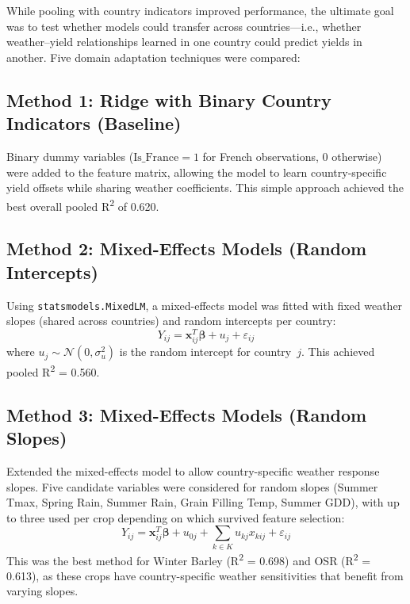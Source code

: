 \documentclass[12pt,a4paper]{report}
\newcommand{\rsq}{R\textsuperscript{2}}
\begin{document}
While pooling with country indicators improved performance, the ultimate goal was to test whether models could transfer across countries---i.e., whether weather--yield relationships learned in one country could predict yields in another. Five domain adaptation techniques were compared:

\subsection{Method 1: Ridge with Binary Country Indicators (Baseline)}

Binary dummy variables ($\text{Is\_France} = 1$ for French observations, 0 otherwise) were added to the feature matrix, allowing the model to learn country-specific yield offsets while sharing weather coefficients. This simple approach achieved the best overall pooled \rsq{} of 0.620.

\subsection{Method 2: Mixed-Effects Models (Random Intercepts)}

Using \texttt{statsmodels.MixedLM}, a mixed-effects model was fitted with fixed weather slopes (shared across countries) and random intercepts per country:
\begin{equation}
    Y_{ij} = \mathbf{x}_{ij}^T \boldsymbol{\beta} + u_j + \varepsilon_{ij}
\end{equation}
where $u_j \sim \mathcal{N}(0, \sigma_u^2)$ is the random intercept for country~$j$. This achieved pooled \rsq{} = 0.560.

\subsection{Method 3: Mixed-Effects Models (Random Slopes)}

Extended the mixed-effects model to allow country-specific weather response slopes. Five candidate variables were considered for random slopes (Summer Tmax, Spring Rain, Summer Rain, Grain Filling Temp, Summer GDD), with up to three used per crop depending on which survived feature selection:
\begin{equation}
    Y_{ij} = \mathbf{x}_{ij}^T \boldsymbol{\beta} + u_{0j} + \sum_{k \in K} u_{kj} x_{kij} + \varepsilon_{ij}
\end{equation}
This was the best method for Winter Barley (\rsq{} = 0.698) and OSR (\rsq{} = 0.613), as these crops have country-specific weather sensitivities that benefit from varying slopes. 
\end{document}
